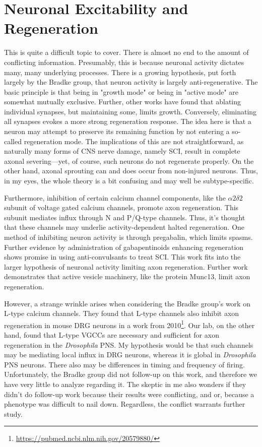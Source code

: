 \section{Neuronal Excitability and Regeneration}

This is quite a difficult topic to cover. There is almost no end to the amount of conflicting information. Presumably, this is because neuronal activity dictates many, many underlying processes. There is a growing hypothesis, put forth largely by the Bradke group, that neuron activity is largely anti-regenerative. The basic principle is that being in "growth mode" or being in "active mode" are somewhat mutually exclusive. Further, other works have found that ablating individual synapses, but maintaining some, limits growth. Conversely, eliminating all synapses evokes a more strong regeneration response. The idea here is that a neuron may attempt to preserve its remaining function by not entering a so-called regeneration mode. The implications of this are not straightforward, as naturally many forms of CNS nerve damage, namely SCI, result in complete axonal severing---yet, of course, such neurons do not regenerate properly. On the other hand, axonal sprouting can and does occur from non-injured neurons. Thus, in my eyes, the whole theory is a bit confusing and may well be subtype-specific.\newline

Furthermore, inhibition of certain calcium channel components, like the $\alpha2\delta2$ subunit of voltage gated calcium channels, promote axon regeneration. This subunit mediates influx through N and P/Q-type channels. Thus, it's thought that these channels may underlie activity-dependent halted regeneration. One method of inhibiting neuron activity is through pregabalin, which limits spasms. Further evidence by administration of gabapentinoids enhancing regeneration shows promise in using anti-convulsants to treat SCI. This work fits into the larger hypothesis of neuronal activity limiting axon regeneration. Further work demonstrates that active vesicle machinery, like the protein Munc13, limit axon regeneration.\newline

However, a strange wrinkle arises when considering the Bradke group's work on L-type calcium channels. They found that L-type channels also inhibit axon regeneration in mouse DRG neurons in a work from 2010\footnote{\url{https://pubmed.ncbi.nlm.nih.gov/20579880/}}. Our lab, on the other hand, found that L-type VGCCs are necessary and sufficient for axon regeneration in the \textit{Drosophila} PNS. My hypothesis would be that such channels may be mediating local influx in DRG neurons, whereas it is global in \textit{Drosophila} PNS neurons. There also may be differences in timing and frequency of firing. Unfortunately, the Bradke group did not follow-up on this work, and therefore we have very little to analyze regarding it. The skeptic in me also wonders if they didn't do follow-up work because their results were conflicting, and or, because a phenotype was difficult to nail down. Regardless, the conflict warrants further study. 



